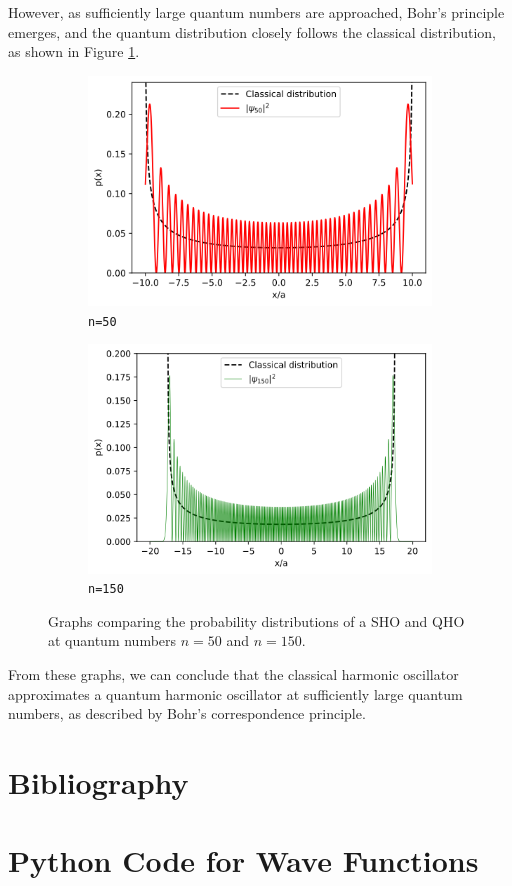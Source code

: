 \documentclass[a4paper]{article}
\begin{document}
However, as sufficiently large quantum numbers are approached, Bohr's principle emerges, and the quantum distribution closely follows the classical distribution, as shown in Figure \ref{fig:bohr}.
\begin{figure}[h!]
  \centering
  \begin{subfigure}{.5\textwidth}
    \centering
    \centerline{\includegraphics[scale=0.55]{n50.png}}
    \caption{{\lstinline$n=50$}}
  \end{subfigure}%
  \begin{subfigure}{.5\textwidth}
    \centering
    \centerline{\includegraphics[scale=0.55]{n150.png}}
    \caption{{\lstinline$n=150$}}
  \end{subfigure}
  \caption{Graphs comparing the probability distributions of a SHO and QHO at quantum numbers $n=50$ and $n=150$.}
  \label{fig:bohr}
  \end{figure}
\newpage
From these graphs, we can conclude that the classical harmonic oscillator approximates a quantum harmonic oscillator at sufficiently large quantum numbers, as described by Bohr's correspondence principle.
\newpage

\begin{appendix}
\section{Bibliography}


\section{Python Code for Wave Functions}\label{sec:python}

\newpage


\end{appendix}
\end{document}
